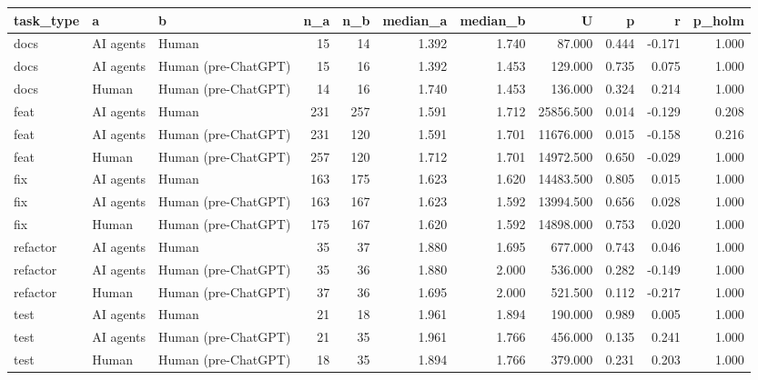\begin{tabular}{lllrrrrrrrr}
\toprule
task_type & a & b & n_a & n_b & median_a & median_b & U & p & r & p_holm \\
\midrule
docs & AI agents & Human & 15 & 14 & 1.392 & 1.740 & 87.000 & 0.444 & -0.171 & 1.000 \\
docs & AI agents & Human (pre-ChatGPT) & 15 & 16 & 1.392 & 1.453 & 129.000 & 0.735 & 0.075 & 1.000 \\
docs & Human & Human (pre-ChatGPT) & 14 & 16 & 1.740 & 1.453 & 136.000 & 0.324 & 0.214 & 1.000 \\
feat & AI agents & Human & 231 & 257 & 1.591 & 1.712 & 25856.500 & 0.014 & -0.129 & 0.208 \\
feat & AI agents & Human (pre-ChatGPT) & 231 & 120 & 1.591 & 1.701 & 11676.000 & 0.015 & -0.158 & 0.216 \\
feat & Human & Human (pre-ChatGPT) & 257 & 120 & 1.712 & 1.701 & 14972.500 & 0.650 & -0.029 & 1.000 \\
fix & AI agents & Human & 163 & 175 & 1.623 & 1.620 & 14483.500 & 0.805 & 0.015 & 1.000 \\
fix & AI agents & Human (pre-ChatGPT) & 163 & 167 & 1.623 & 1.592 & 13994.500 & 0.656 & 0.028 & 1.000 \\
fix & Human & Human (pre-ChatGPT) & 175 & 167 & 1.620 & 1.592 & 14898.000 & 0.753 & 0.020 & 1.000 \\
refactor & AI agents & Human & 35 & 37 & 1.880 & 1.695 & 677.000 & 0.743 & 0.046 & 1.000 \\
refactor & AI agents & Human (pre-ChatGPT) & 35 & 36 & 1.880 & 2.000 & 536.000 & 0.282 & -0.149 & 1.000 \\
refactor & Human & Human (pre-ChatGPT) & 37 & 36 & 1.695 & 2.000 & 521.500 & 0.112 & -0.217 & 1.000 \\
test & AI agents & Human & 21 & 18 & 1.961 & 1.894 & 190.000 & 0.989 & 0.005 & 1.000 \\
test & AI agents & Human (pre-ChatGPT) & 21 & 35 & 1.961 & 1.766 & 456.000 & 0.135 & 0.241 & 1.000 \\
test & Human & Human (pre-ChatGPT) & 18 & 35 & 1.894 & 1.766 & 379.000 & 0.231 & 0.203 & 1.000 \\
\bottomrule
\end{tabular}
